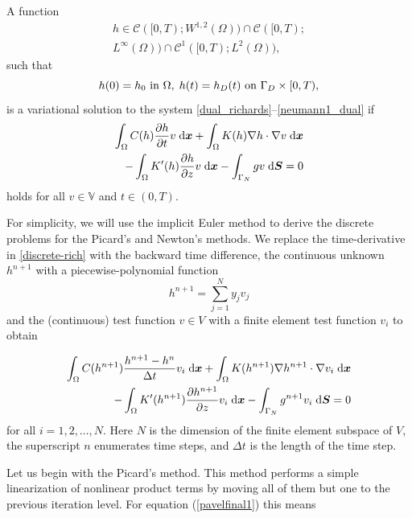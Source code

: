 \documentclass[final,3p,times,twocolumn]{elsarticle}
\newcommand{\bfx}{\mbox{\boldmath $x$}}
\newcommand{\bfS}{\mbox{\boldmath $S$}}
\begin{document}
A function
\begin{equation*}
\begin{split}
h \in \mathcal{C}([0,T);W^{1,2}(\Omega))\cap
\mathcal{C}([0,T); \\ L^{\infty}(\Omega))\cap
\mathcal{C}^1([0,T);L^{2}(\Omega)),
\end{split}
\end{equation*}
such that
$$
h(0)=h_0 \textmd{ in } \Omega, \; h(t)=h_D(t) \textmd{ on } \Gamma_D
\times [0,T),
$$
is a variational solution to the system
\eqref{dual_richards}--\eqref{neumann1_dual} if
\begin{equation}
\begin{split}
\int_{\Omega}  C(h)\frac{\partial h}{\partial t}v \;{\rm
d}\bfx + \int_{\Omega} K(h)\nabla h \cdot \nabla v \;{\rm
d}\bfx \\ - \int_{\Omega}K'(h)\frac{\partial h}{\partial z}v \;{\rm
d}\bfx - \int_{\Gamma_N} g v \;{\rm d}\bfS = 0
\end{split}
\label{discrete-rich}
\end{equation}
holds for all $v \in \mathbb{V}$ and $t\in(0,T)$.

For simplicity, we will use the implicit Euler method 
to derive the discrete problems for the Picard's and 
Newton's methods. We replace the time-derivative
in \eqref{discrete-rich} with the backward time difference, 
the continuous unknown $h^{n+1}$ with a piecewise-polynomial function
$$
h^{n+1} = \sum_{j=1}^N y_j v_j
$$
and the (continuous) test function $v \in V$ with a finite 
element test function $v_i$ to obtain 

\begin{equation}
\begin{split}
\int_{\Omega}  C(h^{n+1})\frac{h^{n+1} - h^n}{\Delta t}v_i \;{\rm
d}\bfx + \int_{\Omega} K(h^{n+1})\nabla h^{n+1} \cdot \nabla v_i \;{\rm
d}\bfx \\ - \int_{\Omega}K'(h^{n+1})\frac{\partial h^{n+1}}{\partial z}v_i \;{\rm
d}\bfx - \int_{\Gamma_N} g^{n+1} v_i \;{\rm d}\bfS = 0
\end{split}
\label{pavelfinal1}
\end{equation}
for all $i = 1, 2, \ldots, N$.
Here $N$ is the dimension of the finite element subspace of $V$,
the superscript $n$ enumerates time steps, and $\Delta t$ is the length of the time step. 


Let us begin with the Picard's method. This method performs a simple linearization of 
nonlinear product terms by moving all of them but one to the previous iteration level.
For equation (\ref{pavelfinal1}) this means
\end{document}
